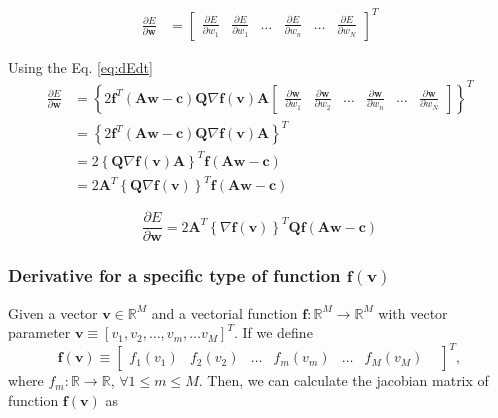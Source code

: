 \begin{align}
\frac{\partial E}{\partial \mathbf{w}}
&=
\begin{bmatrix}
\frac{\partial E}{\partial w_{1}}&
\frac{\partial E}{\partial w_{1}}&
\dots&
\frac{\partial E}{\partial w_{n}}&
\dots&
\frac{\partial E}{\partial w_{N}}
\end{bmatrix}^{T}
\end{align}

Using the Eq. \ref{eq:dEdt}
\begin{align}
\frac{\partial E}{\partial \mathbf{w}}
&=
\left\{
2
\mathbf{f}^{T}\left(\mathbf{A}\mathbf{w}-\mathbf{c}\right)\mathbf{Q}
\nabla \mathbf{f}(\mathbf{v})
\mathbf{A}
\begin{bmatrix}
\frac{\partial \mathbf{w}}{\partial w_{1}}&
\frac{\partial \mathbf{w}}{\partial w_{2}}&
\dots&
\frac{\partial \mathbf{w}}{\partial w_{n}}&
\dots&
\frac{\partial \mathbf{w}}{\partial w_{N}}
\end{bmatrix}
\right\}^{T}\\[4pt]
&=
\left\{
2
\mathbf{f}^{T}\left(\mathbf{A}\mathbf{w}-\mathbf{c}\right)\mathbf{Q}
\nabla \mathbf{f}(\mathbf{v})
\mathbf{A}
\right\}^{T}\\[4pt]
&=
2
\left\{
\mathbf{Q}
\nabla \mathbf{f}(\mathbf{v})
\mathbf{A}
\right\}^{T}
\mathbf{f}\left(\mathbf{A}\mathbf{w}-\mathbf{c}\right)\\[4pt]
&=
2
\mathbf{A}^{T}
\left\{
\mathbf{Q}
\nabla \mathbf{f}(\mathbf{v})
\right\}^{T}
\mathbf{f}\left(\mathbf{A}\mathbf{w}-\mathbf{c}\right)
\end{align}

\begin{equation}
\frac{\partial E}{\partial \mathbf{w}}
=
2
\mathbf{A}^{T}
\left\{
\nabla \mathbf{f}(\mathbf{v})
\right\}^{T}
\mathbf{Q}
\mathbf{f}\left(\mathbf{A}\mathbf{w}-\mathbf{c}\right)
\end{equation}

\subsubsection{Derivative for a specific type of function $\mathbf{f}(\mathbf{v})$}

Given 
a vector $\mathbf{v} \in \mathbb{R}^{M}$ and 
a vectorial function $\mathbf{f}:\mathbb{R}^{M} \to \mathbb{R}^{M}$ with vector parameter 
$\mathbf{v}\equiv \left[v_{1}, v_{2}, \dots,v_{m},\dots v_{M}\right]^{T}$.
If we define 
\begin{equation}
\mathbf{f}(\mathbf{v}) 
\equiv
\begin{bmatrix}
f_{1}(v_{1}) &
f_{2}(v_{2}) &
\dots&
f_{m}(v_{m}) &
\dots&
f_{M}(v_{M}) &
\end{bmatrix}^{T},
\end{equation}
where $f_{m}:\mathbb{R} \to \mathbb{R}$, $\forall 1 \leq m\leq M$.
Then, we can calculate the jacobian matrix of function $\mathbf{f}(\mathbf{v})$ as

